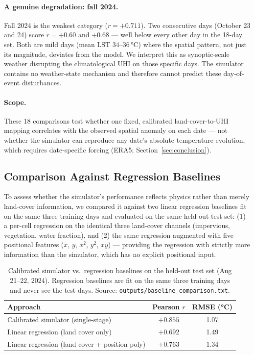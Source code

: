 \documentclass[12pt, letterpaper]{article}
\begin{document}
\paragraph{A genuine degradation: fall 2024.}
Fall 2024 is the weakest category ($r = +0.711$). Two consecutive days
(October 23 and 24) score $r = +0.60$ and $+0.68$ — well below every other
day in the 18-day set. Both are mild days (mean LST 34--36\,°C) where the
spatial pattern, not just its magnitude, deviates from the model. We
interpret this as synoptic-scale weather disrupting the climatological UHI
on those specific days. The simulator contains no weather-state mechanism
and therefore cannot predict these day-of-event disturbances.

\paragraph{Scope.}
These 18 comparisons test whether one fixed, calibrated land-cover-to-UHI
mapping correlates with the observed spatial anomaly on each date —
not whether the simulator can reproduce any date's absolute temperature
evolution, which requires date-specific forcing (ERA5; Section~\ref{sec:conclusion}).

\subsection{Comparison Against Regression Baselines}
\label{sec:baseline}

To assess whether the simulator's performance reflects physics rather than
merely land-cover information, we compared it against two linear regression
baselines fit on the same three training days and evaluated on the same
held-out test set: (1) a per-cell regression on the identical three
land-cover channels (impervious, vegetation, water fraction), and (2) the
same regression augmented with five positional features ($x$, $y$, $x^2$,
$y^2$, $xy$) — providing the regression with strictly more information than
the simulator, which has no explicit positional input.

\begin{table}[ht]
  \centering
  \caption{Calibrated simulator vs.\ regression baselines on the held-out
  test set (Aug 21--22, 2024). Regression baselines are fit on the same
  three training days and never see the test days.
  Source: \texttt{outputs/baseline\_comparison.txt}.}
  \label{tab:baseline}
  \begin{tabular}{lcc}
    \toprule
    Approach & Pearson $r$ & RMSE (°C) \\
    \midrule
    Calibrated simulator (single-stage)           & $+0.855$ & 1.07 \\
    Linear regression (land cover only)            & $+0.692$ & 1.49 \\
    Linear regression (land cover + position poly) & $+0.763$ & 1.34 \\
    \bottomrule
  \end{tabular}
\end{table}
\end{document}
